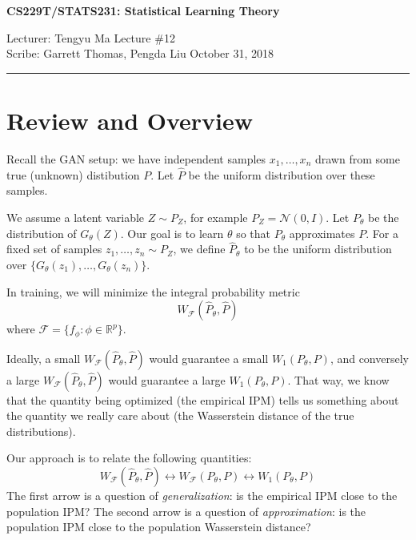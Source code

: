 \documentclass[11pt]{article}
\newcommand{\draftnotice}{\vbox to 0.25in{\noindent
   \raisebox{0.6in}[0in][0in]{\makebox[\textwidth][r]{\it
    DRAFT --- a final version will be posted shortly}}}
   \vspace{-.25in}\vspace{-\baselineskip}
}
\newcommand{\R}{\mathbb{R}}
\newcommand{\cF}{\mathcal{F}}
\newcommand{\WF}{W_{\cF}}
\begin{document}
\thispagestyle{empty}


\begin{center}
\bf\large CS229T/STATS231: Statistical Learning Theory
\end{center}

\noindent
Lecturer: Tengyu Ma   %
\hfill
Lecture \#12               %
\\
Scribe: Garrett Thomas, Pengda Liu                %
\hfill
October 31, 2018           %

\noindent
\rule{\textwidth}{1pt}

\medskip


\section{Review and Overview}
Recall the GAN setup: we have independent samples $x_1, \dots, x_n$ drawn from some true (unknown) distibution $P$.
Let $\hat{P}$ be the uniform distribution over these samples.

We assume a latent variable $Z \sim P_Z$, for example $P_Z = \mathcal{N}(0,I)$.
Let $P_\theta$ be the distribution of $G_\theta(Z)$.
Our goal is to learn $\theta$ so that $P_\theta$ approximates $P$.
For a fixed set of samples $z_1, \dots, z_n \sim P_Z$, we define $\hat{P}_\theta$ to be the uniform distribution over $\{G_\theta(z_1), \dots, G_\theta(z_n)\}$.

In training, we will minimize the integral probability metric
\[\WF(\hat{P}_\theta, \hat{P})\]
where $\cF = \{f_\phi : \phi\in\R^p\}$.

Ideally, a small $\WF(\hat{P}_\theta, \hat{P})$ would guarantee a small $W_1(P_\theta, P)$, and conversely a large $\WF(\hat{P}_\theta, \hat{P})$ would guarantee a large $W_1(P_\theta, P)$.
That way, we know that the quantity being optimized (the empirical IPM) tells us something about the quantity we really care about (the Wasserstein distance of the true distributions).

Our approach is to relate the following quantities:
\[\WF(\hat{P}_\theta, \hat{P}) \longleftrightarrow \WF(P_\theta, P) \longleftrightarrow W_1(P_\theta, P)\]
The first arrow is a question of \textit{generalization}: is the empirical IPM close to the population IPM?
The second arrow is a question of \textit{approximation}: is the population IPM close to the population Wasserstein distance?
\end{document}

